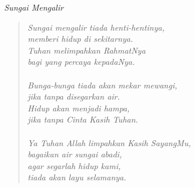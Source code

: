\small
\begin{center}
\itshape{Sungai Mengalir}
\end{center}

\begin{verse}
\itshape{
Sungai mengalir tiada henti-hentinya,\\ 
memberi hidup di sekitarnya.\\
Tuhan melimpahkan RahmatNya \\
bagi yang percaya kepadaNya.\\
{~}\\
Bunga-bunga tiada akan mekar mewangi,\\ 
jika tanpa disegarkan air.\\
Hidup akan menjadi hampa, \\
jika tanpa Cinta Kasih Tuhan.\\
{~}\\
Ya Tuhan Allah limpahkan Kasih SayangMu,\\ 
bagaikan air sungai abadi,\\
agar segarlah hidup kami, \\
tiada akan layu selamanya.\\
}
\end{verse}
\normalsize
